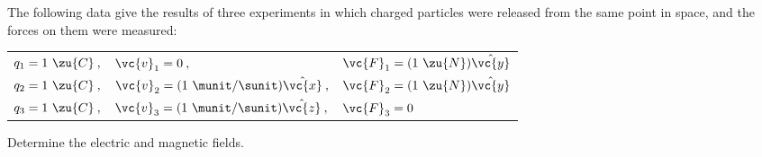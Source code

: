 The following data give the results of three experiments in which charged particles
        were released from the same point in space, and the forces on them were measured:

        \begin{tabular}{lll}
                $q_1=1\ \zu{C}\:,$ & $\vc{v}_1=0\:,$ & $\vc{F}_1=(1\ \zu{N})\hat{\vc{y}}$\\
                $q_2=1\ \zu{C}\:,$ & $\vc{v}_2=(1\ \munit/\sunit)\hat{\vc{x}}\:,$ & $\vc{F}_2=(1\ \zu{N})\hat{\vc{y}}$\\
                $q_3=1\ \zu{C}\:,$ & $\vc{v}_3=(1\ \munit/\sunit)\hat{\vc{z}}\:,$ & $\vc{F}_3=0$\\
        \end{tabular}

        \noindent Determine the electric and magnetic fields.\answercheck
